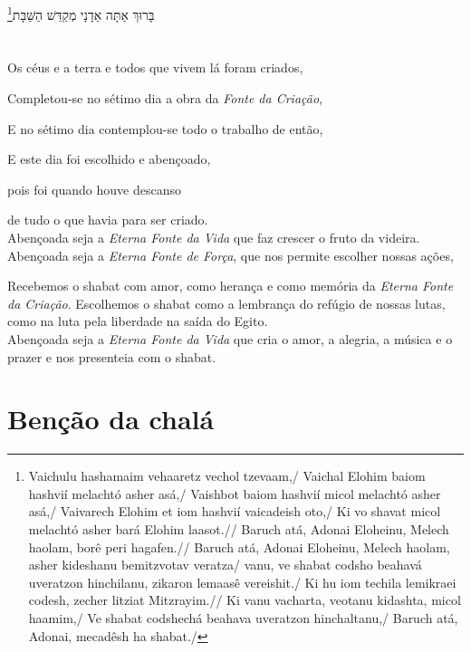 בָּרוּךְ אַתָּה אַדָנָי מְקַדֵּשׁ הַשַּׁבָּת\footnote{
Vaichulu hashamaim vehaaretz vechol tzevaam,/
Vaichal Elohim baiom hashvií melachtó asher asá,/
Vaishbot baiom hashvií micol melachtó asher asá,/
Vaivarech Elohim et iom hashvií vaicadeish oto,/
Ki vo shavat micol melachtó asher bará Elohim laasot.//
Baruch atá, Adonai Eloheinu, Melech haolam, borê peri hagafen.//
Baruch atá, Adonai Eloheinu, Melech haolam, asher kideshanu bemitzvotav veratza/
vanu, ve shabat codsho beahavá uveratzon hinchilanu, zikaron lemaasê vereishit./
Ki hu iom techila lemikraei codesh, zecher litziat Mitzrayim.//
Ki vanu vacharta, veotanu kidashta, micol haamim,/
Ve shabat codshechá beahava uveratzon hinchaltanu,/
Baruch atá, Adonai, mecadêsh ha shabat./}

\movetooddpage
\raggedright

\section{}

Os céus e a terra e todos que vivem lá foram criados,

Completou-se no sétimo dia a obra da \emph{Fonte da Criação},

E no sétimo dia contemplou-se todo o trabalho de \qb{}então,

E este dia foi escolhido e abençoado,

pois foi quando houve descanso

de tudo o que havia para ser criado.\\[10pt]

Abençoada seja a \emph{Eterna Fonte da Vida} que faz crescer \qb{}o fruto da videira.\\[10pt]

Abençoada seja a \emph{Eterna Fonte de Força}, que nos \qb{}permite escolher nossas ações,

Recebemos o shabat com amor, como herança e como memória da \emph{Eterna
Fonte da Criação}. Escolhemos o shabat como a lembrança do refúgio de
nossas lutas, como na luta pela liberdade na saída do Egito.\\[10pt]

Abençoada seja a \emph{Eterna Fonte da Vida} que cria o amor, a alegria,
a música e o prazer e nos presenteia com o shabat.

\movetoevenpage
\raggedleft

\section{Benção da chalá}

